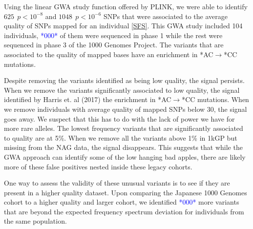 \documentclass[9pt,lineno]{elife}
\newcommand{\todo}[1]{\textcolor{blue}{*#1*}}
\begin{document}
Using the linear GWA study function offered by PLINK, we were able to identify $625\ \  p < 10^{-8}$ and $1048\ \ p < 10^{-6}$ SNPs that were associated to the average quality of SNPs mapped for an individual \ref{SFS}.  This GWA study included 104 individuals, \todo{000} of them were sequenced in phase 1 while the rest were sequenced in phase 3 of the 1000 Genomes Project.
The variants that are associated to the quality of mapped bases have an enrichment in *AC${\rightarrow}$*CC mutations. 

Despite removing the variants identified as being low quality, the signal persists. 
When we remove the variants significantly associated to low quality, the signal identified by Harris et. al (2017) the enrichment in *AC${\rightarrow}$*CC mutations. 
When we remove individuals with average quality of mapped SNPs below 30, the signal goes away. 
We suspect that this has to do with the lack of power we have for more rare alleles. 
The lowest frequency variants that are significantly associated to quality are at 5\%. 
When we remove all the variants above 1\% in 1kGP but missing from the NAG data, the signal disappears.
This suggests that while the GWA approach can identify some of the low hanging bad apples, there are likely more of these false positives nested inside these legacy cohorts. 

One way to assess the validity of these unusual variants is to see if they are present in a higher quality dataset. Upon comparing the Japanese 1000 Genomes cohort to a higher quality and larger cohort, we identified \todo{000} more variants that are beyond the expected frequency spectrum deviation for individuals from the same population. 
\end{document}
